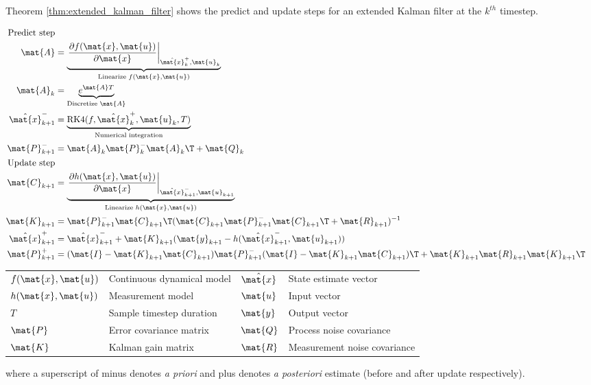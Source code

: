 Theorem \ref{thm:extended_kalman_filter} shows the predict and update steps for
an extended Kalman filter at the $k^{th}$ timestep.
\begin{theorem}
  \label{thm:extended_kalman_filter}
  \begin{align}
    \text{Predict step} \nonumber \\
    \mat{A} &=
      \underbrace{\left.\frac{\partial f(\mat{x}, \mat{u})}{\partial \mat{x}}
                  \right|_{\hat{\mat{x}}_k^+, \mat{u}_k}}
                 _{\text{Linearize } f(\mat{x}, \mat{u})} \\
    \mat{A}_k &= \underbrace{e^{\mat{A}T}}_{\text{Discretize } \mat{A}} \\
    \hat{\mat{x}}_{k+1}^- &=
      \underbrace{\text{RK4}(f, \hat{\mat{x}}_k^+, \mat{u}_k, T)}
                 _{\text{Numerical integration}} \\
    \mat{P}_{k+1}^- &= \mat{A}_k \mat{P}_k^- \mat{A}_k\T + \mat{Q}_k \\
    \text{Update step} \nonumber \\
    \mat{C}_{k+1} &=
      \underbrace{\left.\frac{\partial h(\mat{x}, \mat{u})}{\partial \mat{x}}
                  \right|_{\hat{\mat{x}}_{k+1}^-, \mat{u}_{k+1}}}
                 _{\text{Linearize } h(\mat{x}, \mat{u})} \\
    \mat{K}_{k+1} &= \mat{P}_{k+1}^- \mat{C}_{k+1}\T
      (\mat{C}_{k+1}\mat{P}_{k+1}^- \mat{C}_{k+1}\T + \mat{R}_{k+1})^{-1} \\
    \hat{\mat{x}}_{k+1}^+ &=
      \hat{\mat{x}}_{k+1}^- + \mat{K}_{k+1}(\mat{y}_{k+1} -
      h(\hat{\mat{x}}_{k+1}^-, \mat{u}_{k+1})) \\
    \mat{P}_{k+1}^+ &= (\mat{I} - \mat{K}_{k+1}\mat{C}_{k+1})\mat{P}_{k+1}^-
      (\mat{I} - \mat{K}_{k+1}\mat{C}_{k+1})\T +
      \mat{K}_{k+1}\mat{R}_{k+1}\mat{K}_{k+1}\T
  \end{align}
  \begin{figurekey}
    \begin{tabular}{llll}
      $f(\mat{x}, \mat{u})$ & Continuous dynamical model & $\hat{\mat{x}}$ & State estimate vector \\
      $h(\mat{x}, \mat{u})$ & Measurement model & $\mat{u}$ & Input vector \\
      $T$ & Sample timestep duration & $\mat{y}$ & Output vector \\
      $\mat{P}$ & Error covariance matrix & $\mat{Q}$ & Process noise covariance \\
      $\mat{K}$ & Kalman gain matrix & $\mat{R}$ & Measurement noise covariance \\
    \end{tabular}
  \end{figurekey}

  where a superscript of minus denotes \textit{a priori} and plus denotes
  \textit{a posteriori} estimate (before and after update respectively).
\end{theorem}

